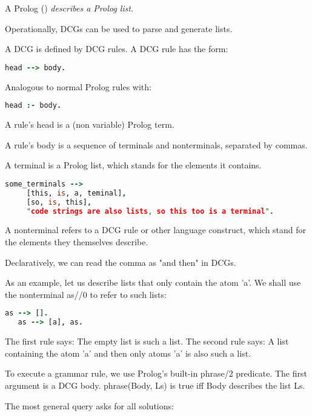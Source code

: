 \secdown

A Prolog 
() \emph{describes a Prolog list}.

Operationally, DCGs can be used to parse and generate lists.


A DCG is defined by DCG rules. A DCG rule has the form:
\begin{lstlisting}[language=prolog]
head --> body.
\end{lstlisting}
Analogous to normal Prolog rules with:

\begin{lstlisting}[language=prolog]
head :- body.
\end{lstlisting}
A rule's head is a (non variable) Prolog term.

A rule's body is a sequence of terminals and nonterminals, separated by commas.

A terminal is a Prolog list, which stands for the elements it contains.

\begin{lstlisting}[language=prolog]
some_terminals -->
     [this, is, a, teminal],
     [so, is, this],
     "code strings are also lists, so this too is a terminal".
\end{lstlisting}
A nonterminal refers to a DCG rule or other language construct, which stand for
the elements they themselves describe.

Declaratively, we can read the comma as "and then" in DCGs.


As an example, let us describe lists that only contain the atom 'a'. We shall
use the nonterminal as//0 to refer to such lists:

\begin{lstlisting}[language=prolog]
   as --> [].
   as --> [a], as.
\end{lstlisting}
The first rule says: The empty list is such a list. The second rule says: A list
containing the atom 'a' and then only atoms 'a' is also such a list.

To execute a grammar rule, we use Prolog's built-in phrase/2 predicate. The
first argument is a DCG body. phrase(Body, Ls) is true iff Body describes the
list Ls.

The most general query asks for all solutions:

